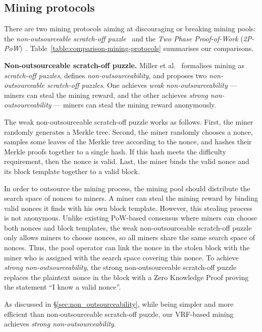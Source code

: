 \subsection{Mining protocols}

There are two mining protocols aiming at discouraging or breaking mining pools: the \textit{non-outsourceable scratch-off puzzle}~\cite{miller2015nonoutsourceable} and the \textit{Two Phase Proof-of-Work} (\textit{2P-PoW})~\cite{2P-PoW}.
Table~\ref{table:comparison-mining-protocols} summarises our comparisons.

\textbf{Non-outsourceable scratch-off puzzle.}
Miller et al.~\cite{miller2015nonoutsourceable} formalises mining as \emph{scratch-off puzzles}, defines \emph{non-outsourceability}, and proposes two \emph{non-outsourceable scratch-off puzzles}.
One achieves \emph{weak non-outsourceability} --- miners can steal the mining reward, and the other achieves \emph{strong non-outsourceability} --- miners can steal the mining reward anonymously.

The weak non-outsourceable scratch-off puzzle works as follows.
First, the miner randomly generates a Merkle tree.
Second, the miner randomly chooses a nonce, samples some leaves of the Merkle tree according to the nonce, and hashes their Merkle proofs together to a single hash.
If this hash meets the difficulty requirement, then the nonce is valid.
Last, the miner binds the valid nonce and its block template together to a valid block.

In order to outsource the mining process, the mining pool should distribute the search space of nonces to miners.
A miner can steal the mining reward by binding valid nonces it finds with his own block template.
However, this stealing process is not anonymous.
Unlike existing PoW-based consensus where miners can choose both nonces and block templates, the weak non-outsourceable scratch-off puzzle only allows miners to choose nonces, so all miners share the same search space of nonces.
Thus, the pool operator can link the nonce in the stolen block with the miner who is assigned with the search space covering this nonce.
To achieve \emph{strong non-outsourceability}, the strong non-outsourceable scratch-off puzzle replaces the plaintext nonce in the block with a Zero Knowledge Proof proving the statement ``I know a valid nonce''.

As discussed in \S\ref{sec:non_outsourceability}, while being simpler and more efficient than non-outsourceable scratch-off puzzle, our VRF-based mining achieves \emph{strong non-outsourceability}.

